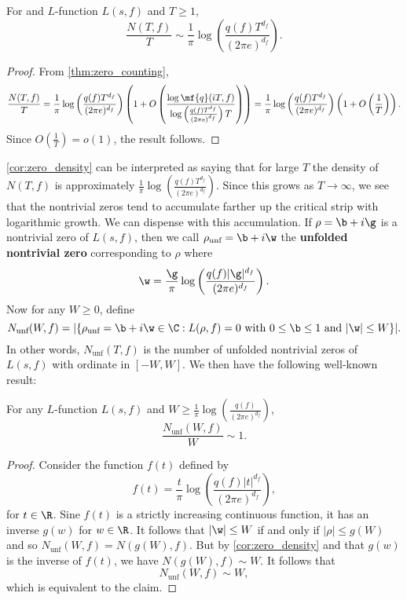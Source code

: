     \begin{corollary}\label{cor:zero_density}
      For and $L$-function $L(s,f)$ and $T \ge 1$,
      \[
        \frac{N(T,f)}{T} \sim \frac{1}{\pi}\log\left(\frac{q(f)T^{d_{f}}}{(2\pi e)^{d_{f}}}\right).
      \]
    \end{corollary}
    \begin{proof}
      From \cref{thm:zero_counting},
      \[
        \frac{N(T,f)}{T} = \frac{1}{\pi}\log\left(\frac{q(f)T^{d_{f}}}{(2\pi e)^{d_{f}}}\right)\left(1+O\left(\frac{\log{\mf{q}(iT,f)}}{\log\left(\frac{q(f)T^{d_{f}}}{(2\pi e)^{d_{f}}}\right)T}\right)\right) = \frac{1}{\pi}\log\left(\frac{q(f)T^{d_{f}}}{(2\pi e)^{d_{f}}}\right)\left(1+O\left(\frac{1}{T}\right)\right).
      \]
      Since $O\left(\frac{1}{T}\right) = o(1)$, the result follows.
    \end{proof}

    \cref{cor:zero_density} can be interpreted as saying that for large $T$ the density of $N(T,f)$ is approximately $\frac{1}{\pi}\log\left(\frac{q(f)T^{d_{f}}}{(2\pi e)^{d_{f}}}\right)$. Since this grows as $T \to \infty$, we see that the nontrivial zeros tend to accumulate farther up the critical strip with logarithmic growth. We can dispense with this accumulation. If $\rho = \b+i\g$ is a nontrivial zero of $L(s,f)$, then we call $\rho_{\text{unf}} = \b+i\w$ the \textbf{unfolded nontrivial zero} corresponding to $\rho$ where
    \[
      \w = \frac{\g}{\pi}\log\left(\frac{q(f)|\g|^{d_{f}}}{(2\pi e)^{d_{f}}}\right).
    \]
    Now for any $W \ge 0$, define
    \[
      N_{\text{unf}}(W,f) = |\{\rho_{\text{unf}} = \b+i\w \in \C:\text{$L(\rho,f) = 0$ with $0 \le \b \le 1$ and $|\w| \le W$}\}|.
    \]
    In other words, $N_{\text{unf}}(T,f)$ is the number of unfolded nontrivial zeros of $L(s,f)$ with ordinate in $[-W,W]$. We then have the following well-known result:

    \begin{proposition}\label{prop:unfolded_zeros_are_evenly_spaced}
    For any $L$-function $L(s,f)$ and $W \ge \frac{1}{\pi}\log\left(\frac{q(f)}{(2\pi e)^{d_{f}}}\right)$,
    \[
      \frac{N_{\text{unf}}(W,f)}{W} \sim 1.
    \]
    \end{proposition}
    \begin{proof}
      Consider the function $f(t)$ defined by
      \[
        f(t) = \frac{t}{\pi}\log\left(\frac{q(f)|t|^{d_{f}}}{(2\pi e)^{d_{f}}}\right),
      \]
      for $t \in \R$. Sine $f(t)$ is a strictly increasing continuous function, it has an inverse $g(w)$ for $w \in \R$. It follows that $|\w| \le W$ if and only if $|\rho| \le g(W)$ and so $N_{\text{unf}}(W,f) = N(g(W),f)$. But by \cref{cor:zero_density} and that $g(w)$ is the inverse of $f(t)$, we have $N(g(W),f) \sim W$. It follows that
      \[
        N_{\text{unf}}(W,f) \sim W,
      \]
      which is equivalent to the claim.
    \end{proof}


